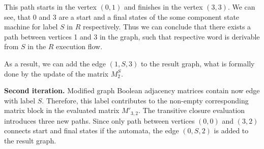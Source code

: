 This path starts in the vertex $(0,1)$ and finishes in the vertex $(3,3)$. 
We can see, that 0 and 3 are a start and a final states of the some component 
state machine for label $S$ in $R$ respectively. Thus we can conclude that 
there exists a path between vertices 1 and 3 in the graph, such that 
respective word is derivable from $S$ in the $R$ execution flow.

As a result, we can add the edge $(1,S,3)$ to the result graph, what is 
formally done by the update of the matrix $M_2^S$.

\textbf{Second iteration.} Modified graph Boolean adjacency matrices contain 
now edge with label $S$. Therefore, this label contributes to the non-empty 
corresponding matrix block in the evaluated matrix $M'_{3,{2}}$. The transitive closure
evaluation introduces three new paths. Since only path between vertices $(0,0)$ and
$(3,2)$ connects start and final states if the automata, the edge $(0,S,2)$ is added
to the result graph.

